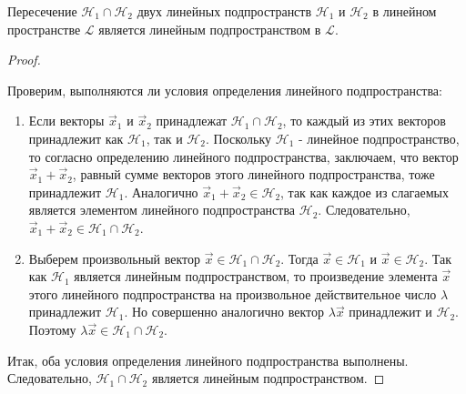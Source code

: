 \begin{theorem}
    Пересечение $\mathcal{H}_1 \cap \mathcal{H}_2$ двух линейных подпространств $\mathcal{H}_1$ и $\mathcal{H}_2$ в линейном пространстве $\mathcal{L}$ является линейным подпространством в $\mathcal{L}$.
\end{theorem}

\begin{proof}~

    Проверим, выполняются ли условия определения линейного подпространства:
    \begin{enumerate}[nosep]
        \item Если векторы $\vec{x}_1$ и $\vec{x}_2$ принадлежат $\mathcal{H}_1 \cap \mathcal{H}_2$, то каждый из этих векторов принадлежит как $\mathcal{H}_1$, так и $\mathcal{H}_2$. Поскольку $\mathcal{H}_1$ - линейное подпространство, то согласно определению линейного подпространства, заключаем, что вектор $\vec{x}_1 + \vec{x}_2$, равный сумме векторов этого линейного подпространства, тоже принадлежит $\mathcal{H}_1$. Аналогично $\vec{x}_1 + \vec{x}_2 \in \mathcal{H}_2$, так как каждое из слагаемых является элементом линейного подпространства $\mathcal{H}_2$. Следовательно, $\vec{x}_1 + \vec{x}_2 \in \mathcal{H}_1 \cap \mathcal{H}_2$.
        \item Выберем произвольный вектор $\vec{x} \in \mathcal{H}_1 \cap \mathcal{H}_2$. Тогда $\vec{x} \in \mathcal{H}_1$ и $\vec{x} \in \mathcal{H}_2$. Так как $\mathcal{H}_1$ является линейным подпространством, то произведение элемента $\vec{x}$ этого линейного подпространства на произвольное действительное число $\lambda$ принадлежит $\mathcal{H}_1$. Но совершенно аналогично вектор $\lambda \vec{x}$ принадлежит и $\mathcal{H}_2$. Поэтому $\lambda \vec{x} \in \mathcal{H}_1 \cap \mathcal{H}_2$. 
    \end{enumerate}
    Итак, оба условия определения линейного подпространства выполнены. Следовательно, $\mathcal{H}_1 \cap \mathcal{H}_2$ является линейным подпространством.
\end{proof}

